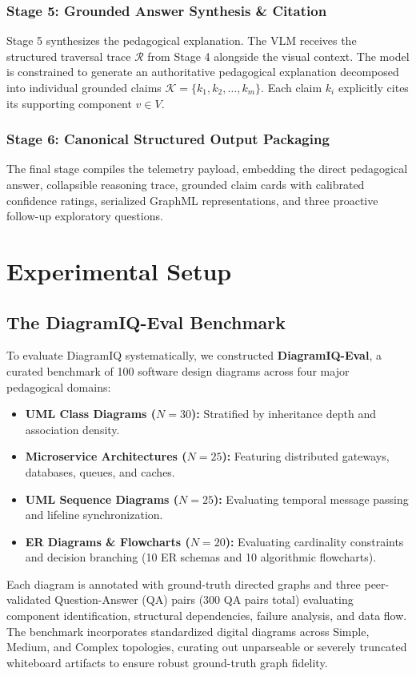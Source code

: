 \documentclass[runningheads]{llncs}
\begin{document}
\subsubsection{Stage 5: Grounded Answer Synthesis \& Citation}
Stage 5 synthesizes the pedagogical explanation. The VLM receives the structured traversal trace $\mathcal{R}$ from Stage 4 alongside the visual context. The model is constrained to generate an authoritative pedagogical explanation decomposed into individual grounded claims $\mathcal{K} = \{k_1, k_2, \dots, k_m\}$. Each claim $k_i$ explicitly cites its supporting component $v \in V$.

\subsubsection{Stage 6: Canonical Structured Output Packaging}
The final stage compiles the telemetry payload, embedding the direct pedagogical answer, collapsible reasoning trace, grounded claim cards with calibrated confidence ratings, serialized GraphML representations, and three proactive follow-up exploratory questions.

\section{Experimental Setup}
\label{sec:experiments}

\subsection{The DiagramIQ-Eval Benchmark}
To evaluate DiagramIQ systematically, we constructed \textbf{DiagramIQ-Eval}, a curated benchmark of 100 software design diagrams across four major pedagogical domains:
\begin{itemize}
    \item \textbf{UML Class Diagrams ($N=30$):} Stratified by inheritance depth and association density.
    \item \textbf{Microservice Architectures ($N=25$):} Featuring distributed gateways, databases, queues, and caches.
    \item \textbf{UML Sequence Diagrams ($N=25$):} Evaluating temporal message passing and lifeline synchronization.
    \item \textbf{ER Diagrams \& Flowcharts ($N=20$):} Evaluating cardinality constraints and decision branching (10 ER schemas and 10 algorithmic flowcharts).
\end{itemize}
Each diagram is annotated with ground-truth directed graphs and three peer-validated Question-Answer (QA) pairs (300 QA pairs total) evaluating component identification, structural dependencies, failure analysis, and data flow. The benchmark incorporates standardized digital diagrams across Simple, Medium, and Complex topologies, curating out unparseable or severely truncated whiteboard artifacts to ensure robust ground-truth graph fidelity.
\end{document}
